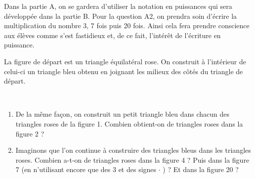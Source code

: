 
\begin{activite}

\begin{partie}
\prof
{Dans la partie A, on se gardera d'utiliser la notation en puissances qui sera développée dans la partie B. Pour la question A2, on prendra soin d'écrire la multiplication du nombre 3, 7 fois puis 20 fois. Ainsi cela fera prendre conscience aux élèves comme s'est fastidieux et, de ce fait, l'intérêt de l'écriture en puissance.}
 \begin{minipage}[c]{0.5\linewidth}
La figure de départ est un triangle équilatéral rose. On construit à l'intérieur de celui-ci un triangle bleu obtenu en joignant les milieux des côtés du triangle de départ.
 \end{minipage} \hfill%
 \begin{minipage}[c]{0.4\linewidth}
 
  \end{minipage} \\[1.5em]
 
 \begin{minipage}[c]{0.2\linewidth}
 \begin{center} 
  
 \end{center}
 \end{minipage} \hfill%
 \begin{minipage}[c]{0.74\linewidth}
  \begin{enumerate}
   \item De la même façon, on construit un petit triangle bleu dans chacun des triangles roses de la figure 1. Combien obtient-on de triangles roses dans la figure 2 ?
   \item Imaginons que l'on continue à construire des triangles bleus dans les triangles roses. Combien a-t-on de triangles roses dans la figure 4 ? Puis dans la figure 7 (en n'utilisant encore que des 3 et des signes $\cdot$ ) ? Et dans la figure 20 ?
   \end{enumerate}
  \end{minipage} \\[1em]
  
\end{partie}



\end{activite}
